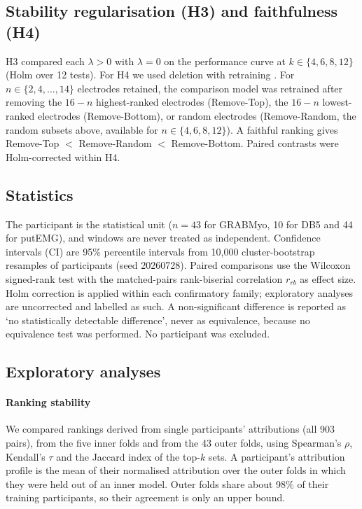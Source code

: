 \subsection{Stability regularisation (H3) and faithfulness (H4)}
H3 compared each $\lambda > 0$ with $\lambda = 0$ on the performance curve at $k \in \{4, 6, 8, 12\}$ (Holm over 12 tests). For H4 we used deletion with retraining \citep{hooker2019benchmark}. For $n \in \{2, 4, \ldots, 14\}$ electrodes retained, the comparison model was retrained after removing the $16 - n$ highest-ranked electrodes (Remove-Top), the $16 - n$ lowest-ranked electrodes (Remove-Bottom), or random electrodes (Remove-Random, the random subsets above, available for $n \in \{4, 6, 8, 12\}$). A faithful ranking gives Remove-Top $<$ Remove-Random $<$ Remove-Bottom. Paired contrasts were Holm-corrected within H4.

\subsection{Statistics}
The participant is the statistical unit ($n = 43$ for GRABMyo, 10 for DB5 and 44 for putEMG), and windows are never treated as independent. Confidence intervals (CI) are 95\% percentile intervals from 10,000 cluster-bootstrap resamples of participants (seed 20260728). Paired comparisons use the Wilcoxon signed-rank test with the matched-pairs rank-biserial correlation $r_{rb}$ as effect size. Holm correction is applied within each confirmatory family; exploratory analyses are uncorrected and labelled as such. A non-significant difference is reported as `no statistically detectable difference', never as equivalence, because no equivalence test was performed. No participant was excluded.

\subsection{Exploratory analyses}
\paragraph{Ranking stability} We compared rankings derived from single participants' attributions (all 903 pairs), from the five inner folds and from the 43 outer folds, using Spearman's $\rho$, Kendall's $\tau$ and the Jaccard index of the top-$k$ sets. A participant's attribution profile is the mean of their normalised attribution over the outer folds in which they were held out of an inner model. Outer folds share about 98\% of their training participants, so their agreement is only an upper bound.

